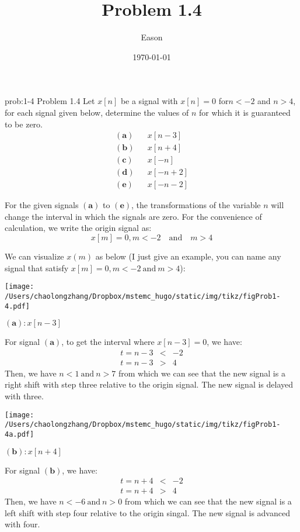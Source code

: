 \documentclass[koma,a4paper,utopia,12pt,listings-color,microtype,paralist,colorlinks,urlcolor=red]{org-article}
\author{Eason}
\date{\today}
\title{Problem 1.4}
\begin{document}
\begin{prob}[]{prob:1-4}
 Problem 1.4 Let \(x[n]\) be a signal with \(x[n]=0\) for\(n< -2\) and \(n>4\),
for each signal given below, determine the values of \(n\) for which it is
guaranteed to be zero.
\begin{eqnarray*}
\mathbf{ (a) } & & x[n-3] \\
\mathbf{ (b) } & & x[n+4] \\
\mathbf{ (c) } & & x[-n]  \\
\mathbf{ (d) } & & x[-n+2] \\
\mathbf{ (e) } & & x[-n-2]
\end{eqnarray*}
\label{prob:1-4}
\end{prob}

For the given signals \(\mathbf{(a)}\) to \(\mathbf{(e)}\), the transformations
of the variable \(n\) will change the interval in which the signals are zero.
For the convenience of calculation, we write the origin signal as:
\begin{equation*}
x[m] = 0, m< -2 \quad \mathrm{and} \quad m>4
\end{equation*}

We can visualize \(x(m)\) as below (I just give an example, you can name any
signal that satisfy \(x[m] = 0, m< -2 \ \mathrm{and} \ m>4\)):

\begin{center}
\texttt{[image: /Users/chaolongzhang/Dropbox/mstemc\_hugo/static/img/tikz/figProb1-4.pdf]}
\end{center}


\(\mathbf{(a)}:x[n-3]\)

For signal \(\mathbf{(a)}\), to get the interval where \(x[n-3] = 0\), we have:
\begin{eqnarray*}
  t=n-3 &<& -2 \\
  t=n-3 &>& 4
\end{eqnarray*}
 Then, we have \(n < 1 \ \mathrm{and} \ n > 7\) from which we can
see that the new signal is a right shift with step three relative to the origin
signal. The new signal is delayed with three.


\begin{center}
\texttt{[image: /Users/chaolongzhang/Dropbox/mstemc\_hugo/static/img/tikz/figProb1-4a.pdf]}
\end{center}

\(\mathbf{(b)}:x[n+4]\)

For signal \(\mathbf{(b)}\), we have:
\begin{eqnarray*}
t=n+4&<&-2 \\
t=n+4&>&4
\end{eqnarray*}
Then, we have \(n<-6\ \mathrm{and}\ n>0\) from which we can see that the new
signal is a left shift with step four relative to the origin singal. The new
signal is advanced with four.
\end{document}
